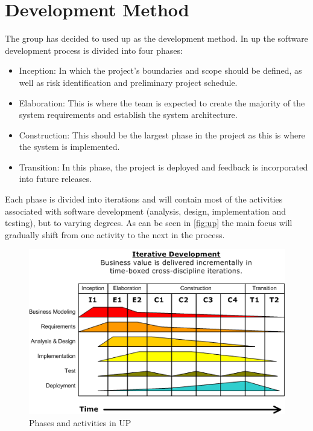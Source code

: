 \section{Development Method}
The group has decided to used \ac{up} as the development method. In \ac{up} the software development process is divided into four phases: 

\begin{itemize}
\item Inception: In which the project's boundaries and scope should be defined, as well as risk identification and preliminary project schedule.
\item Elaboration: This is where the team is expected to create the majority of the system requirements and establish the system architecture.
\item Construction: This should be the largest phase in the project as this is where the system is implemented.
\item Transition: In this phase, the project is deployed and feedback is incorporated into future releases.
\end{itemize}

Each phase is divided into iterations and will contain most of the activities associated with software development (analysis, design, implementation and testing), but to varying degrees. As can be seen in \autoref{fig:up} the main focus will gradually shift from one activity to the next in the process.

\begin{figure}[hptb]
  \centering
    \includegraphics[width=\textwidth]{img/Development-iterative.png}
  \caption{Phases and activities in UP}
  \label{fig:up}
\end{figure}

